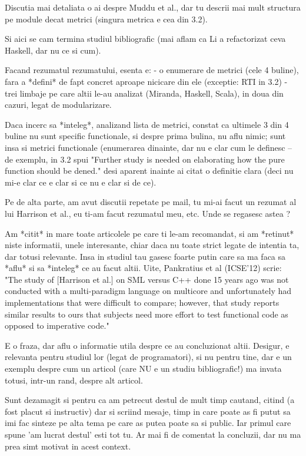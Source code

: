\documentclass{article}
\begin{document}
Discutia mai detaliata o ai despre Muddu et al., dar tu descrii mai
mult structura pe module decat metrici (singura metrica e cea din 3.2).

Si aici se cam termina studiul bibliografic (mai aflam ca Li a
refactorizat ceva Haskell, dar nu ce si cum).

Facand rezumatul rezumatului, esenta e:
- o enumerare de metrici (cele 4 buline), fara a *defini* de fapt
concret aproape nicicare din ele (exceptie: RTI in 3.2)
- trei limbaje pe care altii le-au analizat (Miranda, Haskell, Scala),
in doua din cazuri, legat de modularizare.

Daca incerc sa *inteleg*, analizand lista de metrici, constat ca
ultimele 3 din 4 buline nu sunt specific functionale, si despre prima
bulina, nu aflu nimic; sunt insa si metrici functionale (enumerarea
dinainte, dar nu e clar cum le definesc -- de exemplu, in 3.2 spui
"Further study is needed on elaborating how the pure function should be
dened." desi aparent inainte ai citat o definitie clara (deci nu mi-e
clar ce e clar si ce nu e clar si de ce).

Pe de alta parte, am avut discutii repetate pe mail, tu mi-ai facut
un rezumat al lui Harrison et al., eu ti-am facut rezumatul meu, etc.
Unde se regasesc astea ?

Am *citit* in mare toate articolele pe care ti le-am recomandat, si
am *retinut* niste informatii, unele interesante, chiar daca nu toate
strict legate de intentia ta, dar totusi relevante. Insa in studiul
tau gasesc foarte putin care sa ma faca sa *aflu* si sa *inteleg*
ce au facut altii. Uite, Pankratius et al (ICSE'12) scrie:
"The study of [Harrison et al.] on SML versus C++ done 15 years ago
was not conducted with a multi-paradigm language on multicore and
unfortunately had implementations that were difficult to compare;
however, that study reports similar results to ours that subjects
need more effort to test functional code as opposed to imperative code."


E o fraza, dar aflu o informatie utila despre ce au concluzionat altii.
Desigur, e relevanta pentru studiul lor (legat de programatori), si
nu pentru tine, dar e un exemplu despre cum un articol (care NU e un
studiu bibliografic!) ma invata totusi, intr-un rand, despre alt articol.

Sunt dezamagit si pentru ca am petrecut destul de mult timp cautand,
citind (a fost placut si instructiv) dar si scriind mesaje, timp in care
poate as fi putut sa imi fac sinteze pe alta tema pe care as putea poate
sa si public. Iar primul care spune 'am lucrat destul' esti tot tu.
Ar mai fi de comentat la concluzii, dar nu ma prea simt motivat
in acest context.
\end{document}
